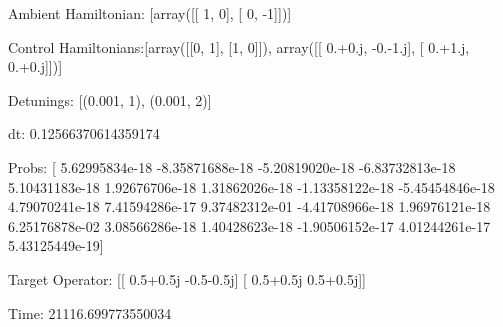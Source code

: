 \documentclass{article}
\begin{document}
    

\newpage

Ambient Hamiltonian: [array([[ 1,  0],
       [ 0, -1]])]

Control Hamiltonians:[array([[0, 1],
       [1, 0]]), array([[ 0.+0.j, -0.-1.j],
       [ 0.+1.j,  0.+0.j]])]

Detunings: [(0.001, 1), (0.001, 2)]

 dt: 0.12566370614359174

Probs: [  5.62995834e-18  -8.35871688e-18  -5.20819020e-18  -6.83732813e-18
   5.10431183e-18   1.92676706e-18   1.31862026e-18  -1.13358122e-18
  -5.45454846e-18   4.79070241e-18   7.41594286e-17   9.37482312e-01
  -4.41708966e-18   1.96976121e-18   6.25176878e-02   3.08566286e-18
   1.40428623e-18  -1.90506152e-17   4.01244261e-17   5.43125449e-19]

Target Operator: [[ 0.5+0.5j -0.5-0.5j]
 [ 0.5+0.5j  0.5+0.5j]]

Time: 21116.699773550034
\end{document}
